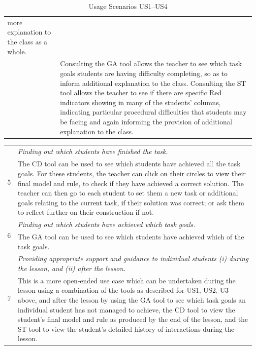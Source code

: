 \begin{table}[htbp]
\begin{tabular}{|p{0.5cm}|p{12.5cm}|}
{    more explanation to the
    class as a whole.} \\
  \cline{2-2} 
  & Consulting the GA tool allows the teacher to see which
  task goals students are having difficulty completing, so as to
  inform additional explanation to the class.  Consulting the ST tool
  allows the teacher to see if there are specific Red indicators
  showing in many of the students’ columns, indicating particular
  procedural difficulties that students may be facing and again
  informing the provision of additional explanation to the class.\\
  \hline
  \end{tabular}
  \caption{Usage Scenarios US1--US4}
  \label{tab:djdjsdjk11}
\end{table}
 
\begin{table}[htbp]
  \begin{tabular}{|p{0.5cm}|p{12.5cm}|}
  \hline \multirow{2}{*}{5}
  & \emph{Finding out which students have finished the task.} \\
  \cline{2-2}
  & The CD tool can be used to see which students have achieved all
  the task goals. For these students, the teacher can click on their
  circles to view their final model and rule, to check if they have
  achieved a correct solution. The teacher can then go to each student
  to set them a new task or additional goals relating to the current
  task, if their solution was correct; or ask them to reflect further
  on their construction if not. \\
  \hline \multirow{2}{*}{6}
  & \emph{Finding out which students have achieved which task goals.} \\
  \cline{2-2}
  & The GA tool can be used to see which students have achieved which
  of the task goals. \\
  \hline \multirow{2}{*}{7}
  & \emph{Providing appropriate support and guidance to individual
  students (i) during the lesson, and (ii) after the lesson.} \\
  \cline{2-2}
  &  This is a more open-ended use case which can be undertaken during
  the lesson using a combination of the tools as described for US1,
  US2, U3 above, and after the lesson by using the GA tool to see
  which task goals an individual student has not managed to achieve,
  the CD tool to view the student’s final model and rule as produced
  by the end of the lesson, and the ST tool to view the student’s
  detailed history of interactions
  during the lesson.  \\

\end{tabular}
\end{table}
